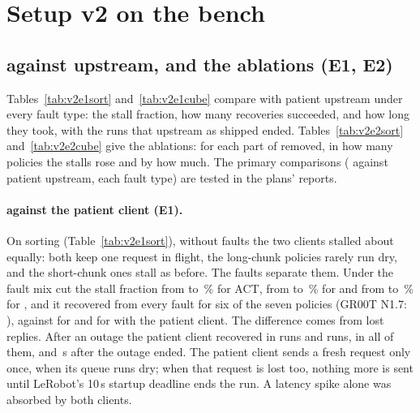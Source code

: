 
\section{Setup v2 on the bench}\label{sec:v2bench}

\subsection{\drtc{} against upstream, and the ablations (E1, E2)}

Tables~\ref{tab:v2e1sort} and~\ref{tab:v2e1cube} compare \drtc{} with patient upstream under every fault type: the
stall fraction, how many recoveries succeeded, and how long they took, with the runs that upstream as shipped ended.
Tables~\ref{tab:v2e2sort} and~\ref{tab:v2e2cube} give the ablations: for each part of \drtc{} removed, in how many
policies the stalls rose and by how much. The primary comparisons (\drtc{} against patient upstream, each fault type)
are tested in the plans' reports.

\paragraph{\drtc{} against the patient client (E1).} On sorting (Table~\ref{tab:v2e1sort}), without faults the two
clients stalled about equally: both keep one request in flight, the long-chunk policies rarely run dry, and the
short-chunk ones stall as before. The faults separate them. Under the fault mix \drtc{} cut the stall fraction from
 to \,\% for ACT, from  to \,\% for
\smolvla{} and from  to \,\% for \pizerofive{}, and it recovered from every
fault for six of the seven policies (GR00T N1.7: ), against  for
\smolvla{} and  for \groot{} with the patient client. The difference comes from lost
replies. After an outage the patient client recovered in  \smolvla{} runs and
 \groot{} runs, \drtc{} in all of them,  and
\,s after the outage ended. The patient client sends a fresh request only once, when its
queue runs dry; when that request is lost too, nothing more is sent until LeRobot's 10\,s startup deadline ends the
run. A latency spike alone was absorbed by both clients.

